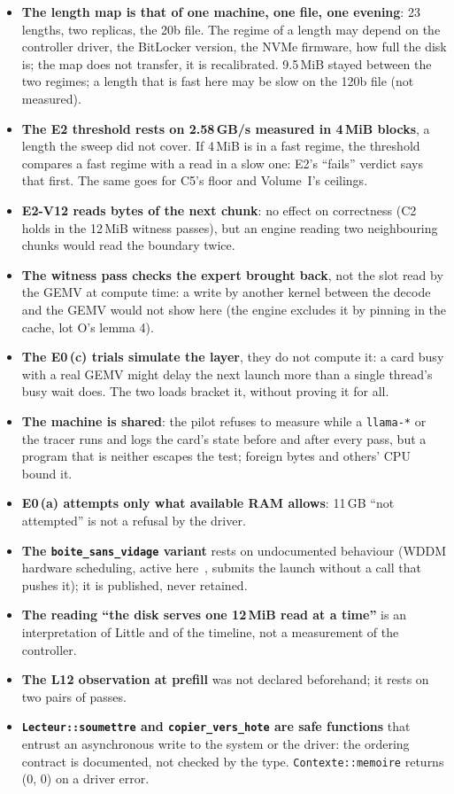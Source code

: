 \begin{faux}
\begin{itemize}
\item \textbf{The length map is that of one machine, one file, one evening}: 23 lengths, two replicas, the 20b file. The regime of a length may depend on the controller driver, the BitLocker version, the NVMe firmware, how full the disk is; the map does not transfer, it is recalibrated. 9.5\,MiB stayed between the two regimes; a length that is fast here may be slow on the 120b file (not measured).
\item \textbf{The E2 threshold rests on 2.58\,GB/s measured in 4\,MiB blocks}, a length the sweep did not cover. If 4\,MiB is in a fast regime, the threshold compares a fast regime with a read in a slow one: E2's ``fails'' verdict says that first. The same goes for C5's floor and Volume~I's ceilings.
\item \textbf{E2-V12 reads bytes of the next chunk}: no effect on correctness (C2 holds in the 12\,MiB witness passes), but an engine reading two neighbouring chunks would read the boundary twice.
\item \textbf{The witness pass checks the expert brought back}, not the slot read by the GEMV at compute time: a write by another kernel between the decode and the GEMV would not show here (the engine excludes it by pinning in the cache, lot O's lemma 4).
\item \textbf{The E0\,(c) trials simulate the layer}, they do not compute it: a card busy with a real GEMV might delay the next launch more than a single thread's busy wait does. The two loads bracket it, without proving it for all.
\item \textbf{The machine is shared}: the pilot refuses to measure while a \texttt{llama-*} or the tracer runs and logs the card's state before and after every pass, but a program that is neither escapes the test; foreign bytes and others' CPU bound it.
\item \textbf{E0\,(a) attempts only what available RAM allows}: 11\,GB ``not attempted'' is not a refusal by the driver.
\item \textbf{The \texttt{boite\_\allowbreak sans\_\allowbreak vidage} variant} rests on undocumented behaviour (WDDM hardware scheduling, active here~\cite{pronovost2020hags}, submits the launch without a call that pushes it); it is published, never retained.
\item \textbf{The reading ``the disk serves one 12\,MiB read at a time''} is an interpretation of Little and of the timeline, not a measurement of the controller.
\item \textbf{The L12 observation at prefill} was not declared beforehand; it rests on two pairs of passes.
\item \textbf{\texttt{Lecteur::soumettre} and \texttt{copier\_vers\_hote} are safe functions} that entrust an asynchronous write to the system or the driver: the ordering contract is documented, not checked by the type. \texttt{Contexte::memoire} returns (0, 0) on a driver error.
\end{itemize}
\end{faux}

